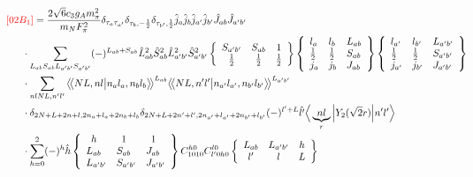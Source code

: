 \documentclass[master]{shnuthesis}
\newcommand{\llangle}{\big\langle\!\big\langle}
\newcommand{\rrangle}{\big\rangle\!\big\rangle}
\newcommand{\ap}{a^\prime}
\newcommand{\bp}{b^\prime}
\newcommand{\il}{\!\!\!\!\!\!\!\!\!\!}
\begin{document}
\begin{align}
    &\il {\color{red} [02B_1]}= \frac{2\sqrt{6}c_3g_A m_\pi^2}{m_N F_{\pi}^2} \delta_{\tau_a \tau_{\ap}}\delta_{\tau_b, -\frac{1}{2}}\delta_{\tau_{\bp}, \frac{1}{2}} \hat{j}_a\hat{j}_b\hat{j}_{\ap}\hat{j}_{\bp} \hat{J}_{ab}\hat{J}_{\ap\bp}  \notag \\
    & \cdot \sum_{L_{ab}S_{ab}L_{\ap\bp}S_{\ap\bp}} (-)^{L_{ab}+S_{ab}} \hat{L}_{ab}^2\hat{S}_{ab}^2\hat{L}_{\ap\bp}^2\hat{S}_{\ap\bp}^2  \left\{\begin{array}{ccc} S_{\ap\bp} & S_{ab} & 1 \\ \frac{1}{2} & \frac{1}{2} & \frac{1}{2} \end{array}\right\}  \left\{\begin{array}{lll}l_{a} & l_{b} & L_{ab} \\ \frac{1}{2} & \frac{1}{2} & S_{ab} \\j_{a} & j_{b} & J_{ab} \end{array}\right\} \left\{\begin{array}{lll}l_{\ap} & l_{\bp} & L_{\ap\bp} \\ \frac{1}{2} & \frac{1}{2} & S_{\ap\bp} \\j_{\ap} & j_{\bp} & J_{\ap\bp} \end{array}\right\}  \notag\\
    & \cdot \sum_{nlNL,n^\prime l^\prime} \llangle N L, n l \big| n_{a} l_{a}, n_{b} l_{b} \rrangle^{L_{ab}} \llangle N L, n^\prime l^\prime \big| n_{a^\prime} l_{a^\prime}, n_{b^\prime} l_{b^\prime} \rrangle^{L_{\ap\bp}} \notag\\
    & \cdot \delta_{2N+L+2n+l,2n_a+l_a+2n_b+l_b}\delta_{2N+L+2n^\prime+l^\prime,2n_{a^\prime}+l_{a^\prime}+2n_{b^\prime}+l_{b^\prime}} (-)^{l^\prime+L}\hat{l^\prime} \Big\langle \underbrace{n l}_{r} \Big| Y_2(\sqrt{2}r) \Big| n^\prime l^\prime \Big\rangle  \notag\\
    & \cdot \sum_{h=0}^{2} (-)^{h}\hat{h} \left\{\begin{array}{lll} \,\,\,h & \,\,\,1 & \,\,\,1 \\ L_{ab} & S_{ab} & J_{ab} \\ L_{\ap\bp} & S_{\ap\bp} & J_{\ap\bp} \end{array}\right\}  C_{1010}^{h0}C_{l^\prime 0 h 0}^{l0}  \left\{\begin{array}{ccc} L_{ab} & L_{\ap\bp} & h \\ l^\prime & l & L \end{array}\right\}
\end{align}
\,\\
\end{document}
